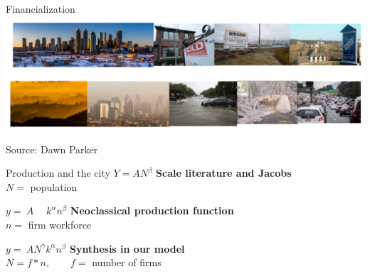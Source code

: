 \documentclass[notes=show]{beamer} %
\begin{document}
\begin{frame}{Financialization}
    \centering
    \includegraphics[scale=0.167]{fig/example_figures/pictures-ex-1.png}
    \vspace{-2.5em} %
    \begin{flushright}
        \tiny{Source: Dawn Parker}
    \end{flushright}
\end{frame}


\begin{frame}{Production and the city}
\huge 
$Y=AN^\beta$ {\normalsize \hfill \textbf{Scale literature and Jacobs}\\\hfill $N =$ population}
\vspace{.5cm}

$y=\:A\quad \;k^\alpha n^\beta$ {\normalsize \hfill \textbf{Neoclassical production function}\\ \hfill$n =$ firm workforce}
\vspace{.5cm}

$y=\:AN^\gamma k^\alpha n^\beta$ {\normalsize \hfill \textbf{Synthesis in our model}\\\hfill $N = f*n, \qquad f=$ number of firms}
\end{frame}
\end{document}
